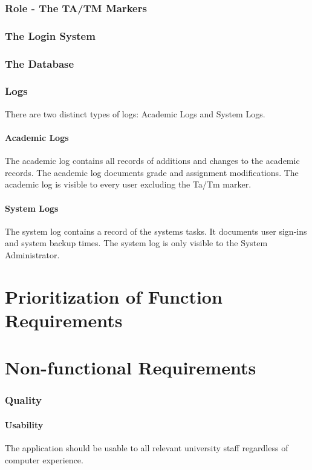 \documentclass{article}
\begin{document}
\section{Role - The TA/TM Markers}

\section{The Login System}

\section{The Database}

\section{Logs}
There are two distinct types of logs: Academic Logs and System Logs.
\subsection{Academic Logs}
The academic log contains all records of additions and changes to the academic records.
The academic log documents grade and assignment modifications.  The academic log
is visible to every user excluding the Ta/Tm marker.
\subsection{System Logs}
The system log contains a record of the systems tasks.  It documents user sign-ins
and system backup times. The system log is only visible to the System Administrator.

\part{Prioritization of Function Requirements}

\part{Non-functional Requirements}
\section{Quality}
\subsection{Usability}
The application should be usable to all relevant university staff
regardless of computer experience.
\end{document}
